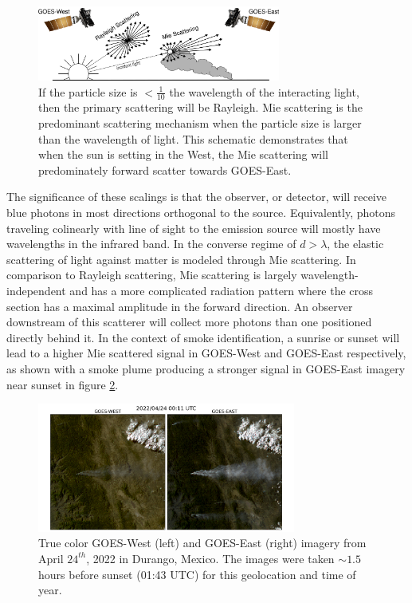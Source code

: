 \begin{figure}
    \centering
    \includegraphics[width=8cm]{figures/mei.png}
    \caption{If the particle size is \(<\frac{1}{10}\) the wavelength of the interacting light, then the primary scattering will be Rayleigh. Mie scattering is the predominant scattering mechanism when the particle size is larger than the wavelength of light. This schematic demonstrates that when the sun is setting in the West, the Mie scattering will predominately forward scatter towards GOES-East.} \label{mei}
\end{figure}

The significance of these scalings is that the observer, or detector, will receive blue photons in most directions orthogonal to the source. Equivalently, photons traveling colinearly with line of sight to the emission source will mostly have wavelengths in the infrared band. In the converse regime of \(d > \lambda\), the elastic scattering of light against matter is modeled through Mie scattering. In comparison to Rayleigh scattering, Mie scattering is largely wavelength-independent and has a more complicated radiation pattern where the cross section has a maximal amplitude in the forward direction. An observer downstream of this scatterer will collect more photons than one positioned directly behind it. In the context of smoke identification, a sunrise or sunset will lead to a higher Mie scattered signal in GOES-West and GOES-East respectively, as shown with a smoke plume producing a stronger signal in GOES-East imagery near sunset in figure \ref{16_vs_17}.

\begin{figure}
    \centering
    \includegraphics[width=8.5cm]{figures/G16_v_G17_2.png}
    \caption{True color GOES-West (left) and GOES-East (right) imagery from April \(24^{th}\), 2022 in Durango, Mexico. The images were taken \(\sim1.5\) hours before sunset (01:43 UTC) for this geolocation and time of year.}\label{16_vs_17}
\end{figure}

